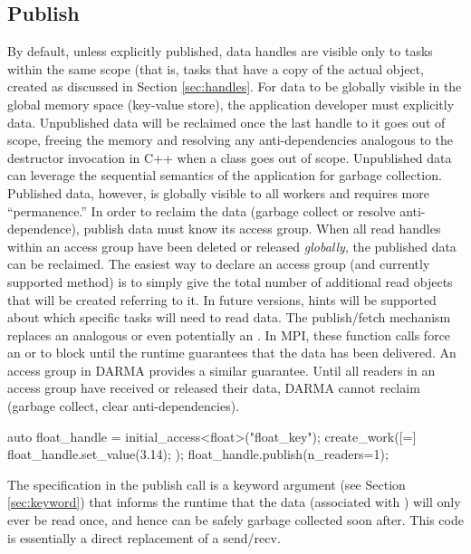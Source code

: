 \subsection{Publish}
\label{subsec:publish}
By default, unless explicitly published, data handles are visible only to tasks
within the same scope (that is, tasks that have a copy of the actual
 object, created as discussed in
Section \ref{sec:handles}.
For data to be globally visible in the global memory space (key-value store),
the application developer must explicitly  data.  Unpublished 
data will be reclaimed once the last handle to it goes out of scope,
freeing the memory and resolving any anti-dependencies analogous to the
destructor invocation in C++ when a class goes out of scope.  Unpublished data
can leverage the sequential semantics of the application for garbage
collection.  Published data, however, is globally visible to all workers and
requires more ``permanence.''  In order to reclaim the data (garbage collect or
resolve anti-dependence), publish data must know its access group.
When all read handles within an access group have been deleted or released
\emph{globally}, the published data can be reclaimed.
The easiest way to declare an access group (and currently supported method) is
to simply give the total number of additional read 
objects that will be created referring to it.
In future versions, hints will be supported about which specific tasks will need
to read data.
The publish/fetch mechanism replaces an analogous  or
even potentially an .
In MPI, these function calls force an  or
 to block until the runtime guarantees that the data has
been delivered.
An access group in DARMA provides a similar guarantee.
Until all readers in an access group have received or released their data, DARMA
cannot reclaim (garbage collect, clear anti-dependencies).

\begin{CppCode}
auto float_handle = initial_access<float>("float_key");
create_work([=]{
  float_handle.set_value(3.14);
});
float_handle.publish(n_readers=1);
\end{CppCode}
The  specification in the publish call is a keyword
argument (see Section \ref{sec:keyword}) that informs the runtime that the data
(associated with ) will only ever be read once, and hence
can be safely garbage collected soon after.  This code is essentially a direct
replacement of a send/recv.


